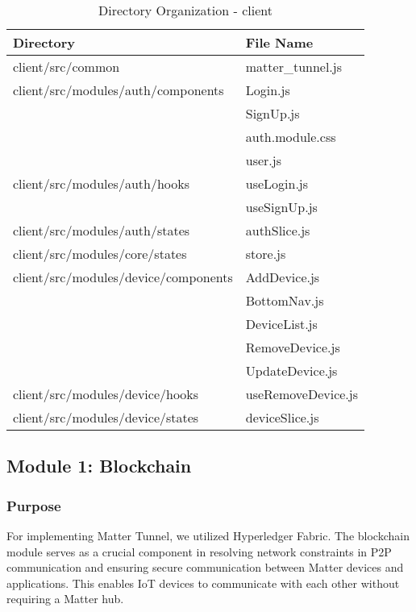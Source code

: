 \documentclass[conference]{IEEEtran}
\begin{document}
\vspace{10cm}

\begin{table}[h]
	\caption{Directory Organization - client}
	\def\arraystretch{1.24} \small
	\begin{tabular}{|p{5cm}|p{2.5cm}|}
		\hline
		Directory                            & File Name          \\
		\hline
		client/src/common                    & matter\_tunnel.js  \\
		\hline
		client/src/modules/auth/components   & Login.js           \\
		                                     & SignUp.js          \\
		                                     & auth.module.css    \\
		                                     & user.js            \\
		\hline
		client/src/modules/auth/hooks        & useLogin.js        \\
		                                     & useSignUp.js       \\
		\hline
		client/src/modules/auth/states       & authSlice.js       \\
		\hline
		client/src/modules/core/states       & store.js           \\
		\hline
		client/src/modules/device/components & AddDevice.js       \\
		                                     & BottomNav.js       \\
		                                     & DeviceList.js      \\
		                                     & RemoveDevice.js    \\
		                                     & UpdateDevice.js    \\
		\hline
		client/src/modules/device/hooks      & useRemoveDevice.js \\
		\hline
		client/src/modules/device/states     & deviceSlice.js     \\
		\hline
	\end{tabular}
\end{table}

\subsection{Module 1: Blockchain}

\subsubsection{Purpose}
For implementing Matter Tunnel, we utilized Hyperledger Fabric. The blockchain module serves as a crucial component in resolving network constraints in P2P communication and ensuring secure communication between Matter devices and applications. This enables IoT devices to communicate with each other without requiring a Matter hub.
\end{document}
